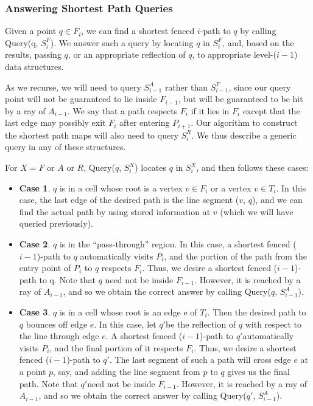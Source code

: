 \documentclass[a4paper]{article}
\begin{document}
\subsubsection{Answering Shortest Path Queries}

Given a point \(q \in F_i\), we can find a shortest fenced \(i\)-path to \(q\) by calling Query(q, \(S^F_i\)). We answer such a query by locating \(q\) in \(S^F_i\), and, based on the results, passing \(q\), or an appropriate reflection of \(q\), to appropriate level-(\(i - 1\)) data structures.

As we recurse, we will need to query \(S^A_{i-1}\) rather than \(S^F_{i-1}\), since our query point will not be guaranteed to lie inside \(F_{i - 1}\), but will be guaranteed to be hit by a ray of \(A_{i - 1}\). We say that a path respects \(F_i\) if it lies in \(F_i\) except that the last edge may possibly exit \(F_i\) after entering \(P_{i + 1}\). Our algorithm to construct the shortest path maps will also need to query \(S^R_i\). We thus describe a generic query in any of these structures. 

For \(X = F\) or \(A\) or \(R\), Query(\(q\), \(S^X_i\)) locates \(q\) in \(S^X_i\), and then follows these cases:

\begin{itemize}
	\item \textbf{Case 1}. \(q\) is in a cell whose root is a vertex \(v \in F_i\) or a vertex \(v \in T_i\). In this case, the last edge of the desired path is the line segment (\(v\), \(q\)), and we can find the actual path by using stored information at \(v\) (which we will have queried previously). 
	\item \textbf{Case 2}. \(q\) is in the “pass-through” region. In this case, a shortest fenced (\(i - 1\))-path to \(q\) automatically visits \(P_i\), and the portion of the path from the entry point of \(P_i\) to \(q\) respects \(F_i\). Thus, we desire a shortest fenced (\(i - 1\))-path to q. Note that \(q\) need not be inside \(F_{i - 1}\). However, it is reached by a ray of \(A_{i - 1}\), and so we obtain the correct answer by calling Query(\(q\), \(S^A_{i-1}\)).
	\item \textbf{Case 3}. \(q\) is in a cell whose root is an edge e of \(T_i\). Then the desired path to \(q\) bounces off edge \(e\). In this case, let \(q'\)be the reflection of \(q\) with respect to the line through edge \(e\). A shortest fenced (\(i - 1\))-path to \(q'\)automatically visits \(P_i\), and the final portion of it respects \(F_i\). Thus, we desire a shortest fenced (\(i - 1\))-path to \(q'\). The last segment of such a path will cross edge \(e\) at a point \(p\), say, and adding the line segment from \(p\) to \(q\) gives us the final path. Note that \(q'\)need not be inside \(F_{i - 1}\). However, it is reached by a ray of \(A_{i - 1}\), and so we obtain the correct answer by calling Query(\(q'\), \(S^A_{i-1}\)).
\end{itemize}
\end{document}
